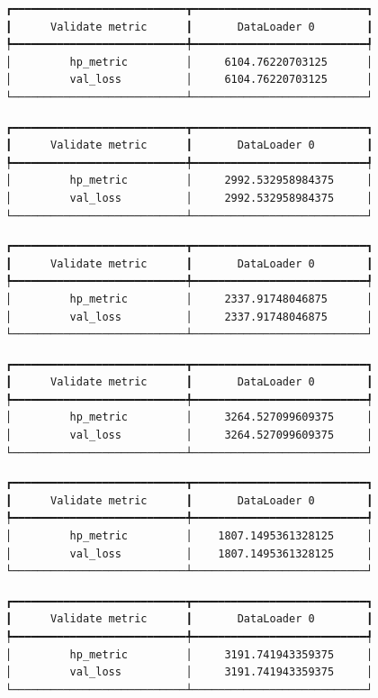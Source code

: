 \documentclass[
  letterpaper,
  DIV=11,
  numbers=noendperiod]{scrreprt}
\begin{document}
\begin{verbatim}
┏━━━━━━━━━━━━━━━━━━━━━━━━━━━┳━━━━━━━━━━━━━━━━━━━━━━━━━━━┓
┃      Validate metric      ┃       DataLoader 0        ┃
┡━━━━━━━━━━━━━━━━━━━━━━━━━━━╇━━━━━━━━━━━━━━━━━━━━━━━━━━━┩
│         hp_metric         │     6104.76220703125      │
│         val_loss          │     6104.76220703125      │
└───────────────────────────┴───────────────────────────┘
\end{verbatim}

\begin{verbatim}
┏━━━━━━━━━━━━━━━━━━━━━━━━━━━┳━━━━━━━━━━━━━━━━━━━━━━━━━━━┓
┃      Validate metric      ┃       DataLoader 0        ┃
┡━━━━━━━━━━━━━━━━━━━━━━━━━━━╇━━━━━━━━━━━━━━━━━━━━━━━━━━━┩
│         hp_metric         │     2992.532958984375     │
│         val_loss          │     2992.532958984375     │
└───────────────────────────┴───────────────────────────┘
\end{verbatim}

\begin{verbatim}
┏━━━━━━━━━━━━━━━━━━━━━━━━━━━┳━━━━━━━━━━━━━━━━━━━━━━━━━━━┓
┃      Validate metric      ┃       DataLoader 0        ┃
┡━━━━━━━━━━━━━━━━━━━━━━━━━━━╇━━━━━━━━━━━━━━━━━━━━━━━━━━━┩
│         hp_metric         │     2337.91748046875      │
│         val_loss          │     2337.91748046875      │
└───────────────────────────┴───────────────────────────┘
\end{verbatim}

\begin{verbatim}
┏━━━━━━━━━━━━━━━━━━━━━━━━━━━┳━━━━━━━━━━━━━━━━━━━━━━━━━━━┓
┃      Validate metric      ┃       DataLoader 0        ┃
┡━━━━━━━━━━━━━━━━━━━━━━━━━━━╇━━━━━━━━━━━━━━━━━━━━━━━━━━━┩
│         hp_metric         │     3264.527099609375     │
│         val_loss          │     3264.527099609375     │
└───────────────────────────┴───────────────────────────┘
\end{verbatim}

\begin{verbatim}
┏━━━━━━━━━━━━━━━━━━━━━━━━━━━┳━━━━━━━━━━━━━━━━━━━━━━━━━━━┓
┃      Validate metric      ┃       DataLoader 0        ┃
┡━━━━━━━━━━━━━━━━━━━━━━━━━━━╇━━━━━━━━━━━━━━━━━━━━━━━━━━━┩
│         hp_metric         │    1807.1495361328125     │
│         val_loss          │    1807.1495361328125     │
└───────────────────────────┴───────────────────────────┘
\end{verbatim}

\begin{verbatim}
┏━━━━━━━━━━━━━━━━━━━━━━━━━━━┳━━━━━━━━━━━━━━━━━━━━━━━━━━━┓
┃      Validate metric      ┃       DataLoader 0        ┃
┡━━━━━━━━━━━━━━━━━━━━━━━━━━━╇━━━━━━━━━━━━━━━━━━━━━━━━━━━┩
│         hp_metric         │     3191.741943359375     │
│         val_loss          │     3191.741943359375     │
└───────────────────────────┴───────────────────────────┘
\end{verbatim}
\end{document}
